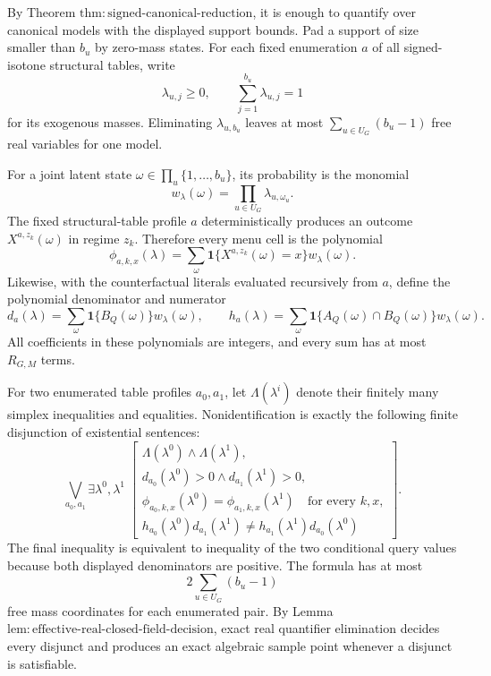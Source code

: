 By Theorem \(\mathrm{thm:signed\text{-}canonical\text{-}reduction}\), it is enough to quantify over canonical models with the displayed support bounds.  Pad a support of size smaller than \(b_u\) by zero-mass states.  For each fixed enumeration \(a\) of all signed-isotone structural tables, write
\[
 \lambda_{u,j}\geq0,
 \qquad
 \sum_{j=1}^{b_u}\lambda_{u,j}=1
 \]
for its exogenous masses.  Eliminating \(\lambda_{u,b_u}\) leaves at most \(\sum_{u\in U_G}(b_u-1)\) free real variables for one model.

For a joint latent state \(\omega\in\prod_u\{1,\ldots,b_u\}\), its probability is the monomial
\[
 w_\lambda(\omega)=\prod_{u\in U_G}\lambda_{u,\omega_u}.
\]
The fixed structural-table profile \(a\) deterministically produces an outcome \(X^{a,z_k}(\omega)\) in regime \(z_k\).  Therefore every menu cell is the polynomial
\[
 \phi_{a,k,x}(\lambda)
 =\sum_{\omega}
 \mathbf 1\{X^{a,z_k}(\omega)=x\}
 w_\lambda(\omega).
\]
Likewise, with the counterfactual literals evaluated recursively from \(a\), define the polynomial denominator and numerator
\[
 d_a(\lambda)
 =\sum_{\omega}\mathbf 1\{B_Q(\omega)\}w_\lambda(\omega),
 \qquad
 h_a(\lambda)
 =\sum_{\omega}\mathbf 1\{A_Q(\omega)\cap B_Q(\omega)\}w_\lambda(\omega).
\]
All coefficients in these polynomials are integers, and every sum has at most \(R_{G,M}\) terms.

For two enumerated table profiles \(a_0,a_1\), let \(\Lambda(\lambda^i)\) denote their finitely many simplex inequalities and equalities.  Nonidentification is exactly the following finite disjunction of existential sentences:
\[
 \bigvee_{a_0,a_1}
 \exists\lambda^0,\lambda^1\;\left[
 \begin{array}{l}
 \Lambda(\lambda^0)\wedge\Lambda(\lambda^1),\\
 d_{a_0}(\lambda^0)>0\wedge d_{a_1}(\lambda^1)>0,\\
 \phi_{a_0,k,x}(\lambda^0)=\phi_{a_1,k,x}(\lambda^1)
 \quad\text{for every }k,x,\\
 h_{a_0}(\lambda^0)d_{a_1}(\lambda^1)
 \neq h_{a_1}(\lambda^1)d_{a_0}(\lambda^0)
 \end{array}
 \right].
\]
The final inequality is equivalent to inequality of the two conditional query values because both displayed denominators are positive.  The formula has at most
\[
 2\sum_{u\in U_G}(b_u-1)
\]
free mass coordinates for each enumerated pair.  By Lemma \(\mathrm{lem:effective\text{-}real\text{-}closed\text{-}field\text{-}decision}\), exact real quantifier elimination decides every disjunct and produces an exact algebraic sample point whenever a disjunct is satisfiable.

